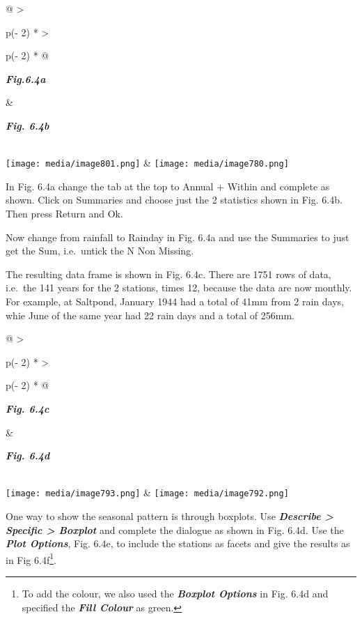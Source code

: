\documentclass[
  letterpaper,
  DIV=11,
  numbers=noendperiod]{scrreprt}
\begin{document}
\begin{longtable}[]{@{}
  >{\raggedright\arraybackslash}p{(\columnwidth - 2\tabcolsep) * }
  >{\raggedright\arraybackslash}p{(\columnwidth - 2\tabcolsep) * }@{}}
\toprule\noalign{}
\begin{minipage}[b]{\linewidth}\raggedright
\textbf{\emph{Fig.6.4a}}
\end{minipage} & \begin{minipage}[b]{\linewidth}\raggedright
\textbf{\emph{Fig. 6.4b}}
\end{minipage} \\
\midrule\noalign{}
\endhead
\bottomrule\noalign{}
\endlastfoot
\texttt{[image: media/image801.png]} &
\texttt{[image: media/image780.png]} \\
\end{longtable}

In Fig. 6.4a change the tab at the top to Annual + Within and complete
as shown. Click on Summaries and choose just the 2 statistics shown in
Fig. 6.4b. Then press Return and Ok.

Now change from rainfall to Rainday in Fig. 6.4a and use the Summaries
to just get the Sum, i.e.~untick the N Non Missing.

The resulting data frame is shown in Fig. 6.4c. There are 1751 rows of
data, i.e.~the 141 years for the 2 stations, times 12, because the data
are now monthly. For example, at Saltpond, January 1944 had a total of
41mm from 2 rain days, whie June of the same year had 22 rain days and a
total of 256mm.

\begin{longtable}[]{@{}
  >{\raggedright\arraybackslash}p{(\columnwidth - 2\tabcolsep) * }
  >{\raggedright\arraybackslash}p{(\columnwidth - 2\tabcolsep) * }@{}}
\toprule\noalign{}
\begin{minipage}[b]{\linewidth}\raggedright
\textbf{\emph{Fig. 6.4c}}
\end{minipage} & \begin{minipage}[b]{\linewidth}\raggedright
\textbf{\emph{Fig. 6.4d}}
\end{minipage} \\
\midrule\noalign{}
\endhead
\bottomrule\noalign{}
\endlastfoot
\texttt{[image: media/image793.png]} &
\texttt{[image: media/image792.png]} \\
\end{longtable}

One way to show the seasonal pattern is through boxplots. Use
\textbf{\emph{Describe \textgreater{} Specific \textgreater{} Boxplot}}
and complete the dialogue as shown in Fig. 6.4d. Use the
\textbf{\emph{Plot Options}}, Fig. 6.4e, to include the stations as
facets and give the results as in Fig 6.4f\footnote{To add the colour,
  we also used the \textbf{\emph{Boxplot Options}} in Fig. 6.4d and
  specified the \textbf{\emph{Fill Colour}} as green.}.
\end{document}
